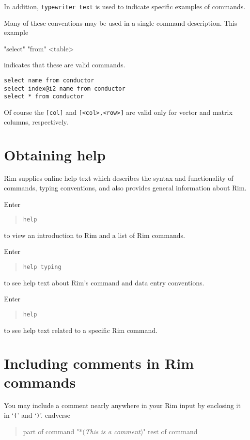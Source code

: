 \documentclass[11pt,a4paper]{report}
\begin{document}
In addition, {\tt typewriter text} is used to indicate specific
examples of commands.
 
Many of these conventions may be used in a single command description.
This example

"select" 
     "from" <table>

indicates that these are valid commands.
 
\begin{verbatim}
select name from conductor
select index@i2 name from conductor
select * from conductor
\end{verbatim}
 
Of course the \verb![col]! and
\verb![<col>,<row>]! are valid only for vector and matrix
columns, respectively.
 
 
\section{Obtaining help}
Rim supplies online help text which describes the
syntax and functionality of commands,
 typing conventions, and also provides general information about Rim.

Enter
\begin{verse}
\verb!help!
\end{verse}

to view an introduction to Rim and a list of Rim commands.

Enter
\begin{verse}
\verb!help typing!
\end{verse}
to see help text about Rim's command and data entry conventions.

Enter
\begin{verse}
\verb!help! 
\end{verse}
to see help text related to a specific Rim command.
 
\section{Including comments in Rim commands}
%
You may include a comment nearly anywhere in your Rim input
by enclosing it in `{\tt*(}' and `{\tt )}'.
end{verse}
\begin{verse}
part of command  "*({\em This is a comment})"  rest of command
\end{verse}
\end{document}
